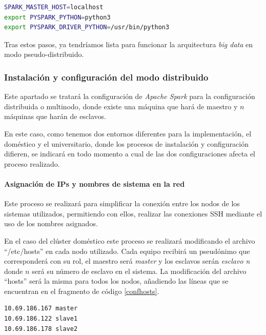 \begin{lstlisting}[label=envStand,language=sh,frame=single,caption=Líneas a añadir en el fichero ``spark-env.sh'' para configurar \textit{Apache Spark} en el modo pseudo-distribuido]
SPARK_MASTER_HOST=localhost
export PYSPARK_PYTHON=python3
export PYSPARK_DRIVER_PYTHON=/usr/bin/python3
\end{lstlisting}

Tras estos pasos, ya tendríamos lista para funcionar la arquitectura \textit{big data} en modo pseudo-distribuido. 

\subsubsection{Instalación y configuración del modo distribuido}
Este apartado se tratará la configuración de \textit{Apache Spark} para la configuración distribuida o multinodo, donde existe una máquina que hará de maestro y $n$ máquinas que harán de esclavos. 

En este caso, como tenemos dos entornos diferentes para la implementación, el doméstico y el universitario, donde los procesos de instalación y configuración difieren, se indicará en todo momento a cual de las dos configuraciones afecta el proceso realizado.

\paragraph{Asignación de IPs y nombres de sistema en la red}
Este proceso se realizará para simplificar la conexión entre los nodos de los sistemas utilizados, permitiendo con ellos, realizar las conexiones \gls{SSH} mediante el uso de los nombres asignados. 

En el caso del clúster doméstico este proceso se realizará modificando el archivo ``/etc/hosts'' en cada nodo utilizado. Cada equipo recibirá un pseudónimo que corresponderá con su rol, el maestro será \textit{master} y los esclavos serán \textit{esclavo n} donde $n$ será su número de esclavo en el sistema. La modificación del archivo ``hosts'' será la misma para todos los nodos, añadiendo las líneas que se encuentran en el fragmento de código \ref{confhosts}.

\begin{lstlisting}[label=confhosts,language=sh,frame=single,caption=Líneas a añadir en el fichero ``/etc/hosts'' en cada nodo del cúster doméstico]
10.69.186.167 master
10.69.186.122 slave1
10.69.186.178 slave2
\end{lstlisting}


